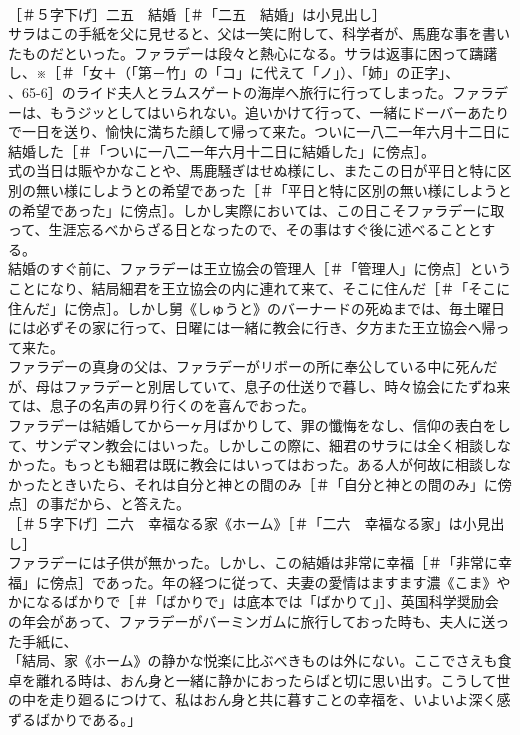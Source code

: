 \documentclass[8pt]{extreport}
\begin{document}
\begin{CJK}{UTF8}{min}
\\	［＃５字下げ］二五　結婚［＃「二五　結婚」は小見出し］
\\	サラはこの手紙を父に見せると、父は一笑に附して、科学者が、馬鹿な事を書いたものだといった。ファラデーは段々と熱心になる。サラは返事に困って躊躇し、※［＃「女＋（「第－竹」の「コ」に代えて「ノ」）、「姉」の正字」、
\\	、65-6］のライド夫人とラムスゲートの海岸へ旅行に行ってしまった。ファラデーは、もうジッとしてはいられない。追いかけて行って、一緒にドーバーあたりで一日を送り、愉快に満ちた顔して帰って来た。ついに一八二一年六月十二日に結婚した［＃「ついに一八二一年六月十二日に結婚した」に傍点］。
\\	式の当日は賑やかなことや、馬鹿騒ぎはせぬ様にし、またこの日が平日と特に区別の無い様にしようとの希望であった［＃「平日と特に区別の無い様にしようとの希望であった」に傍点］。しかし実際においては、この日こそファラデーに取って、生涯忘るべからざる日となったので、その事はすぐ後に述べることとする。
\\	結婚のすぐ前に、ファラデーは王立協会の管理人［＃「管理人」に傍点］ということになり、結局細君を王立協会の内に連れて来て、そこに住んだ［＃「そこに住んだ」に傍点］。しかし舅《しゅうと》のバーナードの死ぬまでは、毎土曜日には必ずその家に行って、日曜には一緒に教会に行き、夕方また王立協会へ帰って来た。
\\	ファラデーの真身の父は、ファラデーがリボーの所に奉公している中に死んだが、母はファラデーと別居していて、息子の仕送りで暮し、時々協会にたずね来ては、息子の名声の昇り行くのを喜んでおった。
\\	ファラデーは結婚してから一ヶ月ばかりして、罪の懺悔をなし、信仰の表白をして、サンデマン教会にはいった。しかしこの際に、細君のサラには全く相談しなかった。もっとも細君は既に教会にはいってはおった。ある人が何故に相談しなかったときいたら、それは自分と神との間のみ［＃「自分と神との間のみ」に傍点］の事だから、と答えた。
\\	［＃５字下げ］二六　幸福なる家《ホーム》［＃「二六　幸福なる家」は小見出し］
\\	ファラデーには子供が無かった。しかし、この結婚は非常に幸福［＃「非常に幸福」に傍点］であった。年の経つに従って、夫妻の愛情はますます濃《こま》やかになるばかりで［＃「ばかりで」は底本では「ばかりて」］、英国科学奨励会
\\	の年会があって、ファラデーがバーミンガムに旅行しておった時も、夫人に送った手紙に、
\\	「結局、家《ホーム》の静かな悦楽に比ぶべきものは外にない。ここでさえも食卓を離れる時は、おん身と一緒に静かにおったらばと切に思い出す。こうして世の中を走り廻るにつけて、私はおん身と共に暮すことの幸福を、いよいよ深く感ずるばかりである。」

\end{CJK}
\end{document}
